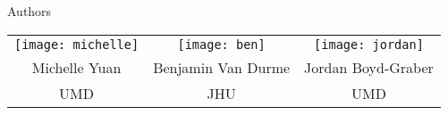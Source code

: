 \begin{frame}[c]{Authors}
\begin{center}
\begin{tabular}{ccc}
\texttt{[image: michelle]}   & \texttt{[image: ben]}  & \texttt{[image: jordan]} \\
    Michelle Yuan & Benjamin Van Durme & Jordan Boyd-Graber \\
    UMD & JHU & UMD \\
\end{tabular}
\end{center}
\end{frame}
